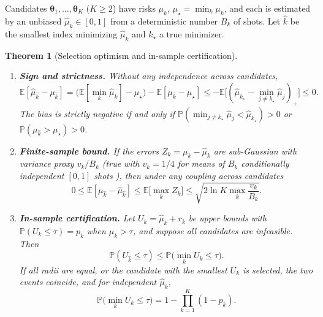 \documentclass[a4paper,onecolumn,unpublished]{quantumarticle}
\newcommand{\Prob}{\mathbb{P}}
\newcommand{\E}{\mathbb{E}}
\renewcommand{\th}{\bm{\theta}}
\begin{document}
Candidates $\th_1, \dots, \th_K$ ($K \ge 2$) have risks $\mu_k$, $\mu_\star = \min_k \mu_k$, and each is estimated by an unbiased $\widehat\mu_k \in [0, 1]$ from a deterministic number $B_k$ of shots. Let $\hat k$ be the smallest index minimizing $\widehat\mu_k$ and $k_\star$ a true minimizer.

\medskip\noindent\textbf{Theorem 1} (Selection optimism and in-sample certification).\label{thm:selection_bias}
\begin{enumerate}
  \item[\emph{(a)}] \emph{\textbf{Sign and strictness.} Without any independence across candidates,}
  \begin{equation}
    \E[\widehat\mu_{\hat k} - \mu_{\hat k}]
    = \bigl(\E[\min_k \widehat\mu_k] - \mu_\star\bigr) - \E[\mu_{\hat k} - \mu_\star]
    \le -\E\bigl[(\widehat\mu_{k_\star} - \min_{j\neq k_\star}\widehat\mu_j)_+\bigr] \le 0.
    \label{eq:selection_decomposition}
  \end{equation}
  \emph{The bias is strictly negative if and only if $\Prob(\min_{j\neq k_\star}\widehat\mu_j < \widehat\mu_{k_\star}) > 0$ or $\Prob(\mu_{\hat k} > \mu_\star) > 0$.}
  \item[\emph{(b)}] \emph{\textbf{Finite-sample bound.} If the errors $Z_k = \mu_k - \widehat\mu_k$ are sub-Gaussian with variance proxy $v_k / B_k$ (true with $v_k = 1/4$ for means of $B_k$ conditionally independent $[0, 1]$ shots \cite{hoeffding1963}), then under any coupling across candidates}
  \begin{equation}
    0 \le \E[\mu_{\hat k} - \widehat\mu_{\hat k}]
    \le \E\bigl[\max_k Z_k\bigr]
    \le \sqrt{2\ln K \max_k \frac{v_k}{B_k}}.
    \label{eq:selection_bound}
  \end{equation}
  \item[\emph{(c)}] \emph{\textbf{In-sample certification.} Let $U_k = \widehat\mu_k + r_k$ be upper bounds with $\Prob(U_k \le \tau) = p_k$ when $\mu_k > \tau$, and suppose all candidates are infeasible. Then}
  \begin{equation}
    \Prob(U_{\hat k} \le \tau) \le \Prob\bigl(\min_k U_k \le \tau\bigr).
    \label{eq:insample_partition}
  \end{equation}
  \emph{If all radii are equal, or the candidate with the smallest $U_k$ is selected, the two events coincide, and for independent $\widehat\mu_k$,}
  \begin{equation}
    \Prob\bigl(\min_k U_k \le \tau\bigr) = 1 - \prod_{k=1}^K (1 - p_k).
    \label{eq:insample_product}
  \end{equation}
\end{enumerate}
\end{document}
